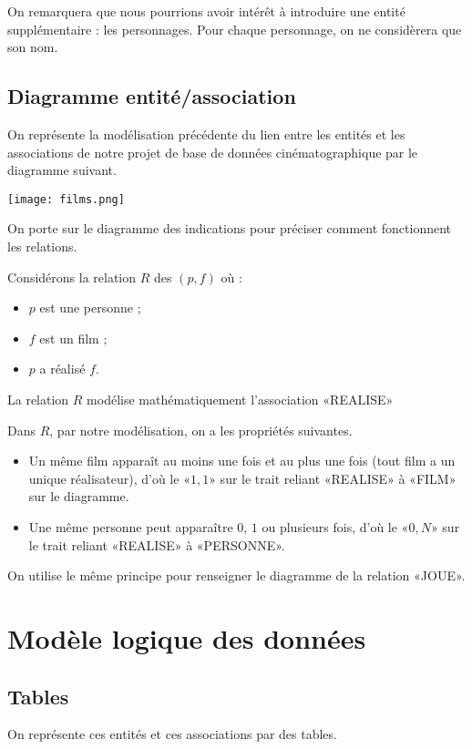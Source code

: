 On remarquera que nous pourrions avoir intérêt à introduire une entité supplémentaire : les personnages. Pour chaque personnage, on ne considèrera que son nom. 

\subsection{Diagramme entité/association}

On représente la modélisation précédente du lien entre les entités et les associations de notre projet de base de données cinématographique par le diagramme suivant.
\begin{center}
\texttt{[image: films.png]}
\end{center}

On porte sur le diagramme des indications pour préciser comment
fonctionnent les relations.

Considérons la relation $R$ des $(p,f)$ où :
\begin{itemize}
\item $p$ est une personne ;
\item $f$ est un film ;
\item $p$ a réalisé $f$.
\end{itemize}
\begin{rem}
  La relation $R$ modélise mathématiquement l'association «REALISE»
\end{rem}


Dans $R$, par notre modélisation, on a les propriétés suivantes. 
\begin{itemize}
\item Un même film apparaît au moins une fois et au plus une fois
  (tout film a un unique réalisateur), d'où le «$1,1$» sur le trait
  reliant «REALISE» à «FILM» sur le diagramme.
\item Une même personne peut apparaître $0$, $1$ ou plusieurs fois,
  d'où le «$0, N$» sur le trait reliant «REALISE» à «PERSONNE».
\end{itemize}

On utilise le même principe pour renseigner le diagramme de la relation «JOUE».

\section{Modèle logique des données}
\subsection{Tables}
On représente ces entités et ces associations par des tables. 

